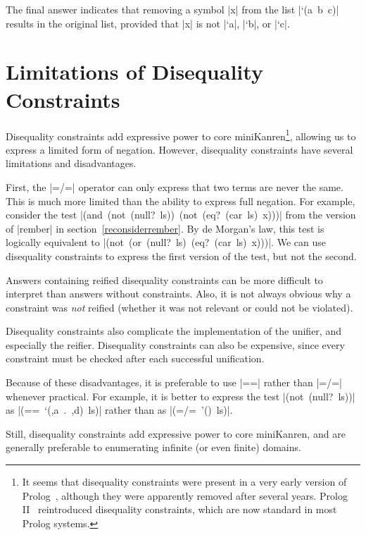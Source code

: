 The final answer indicates that removing a symbol \mbox{\scheme|x|}
from the list \mbox{\scheme|`(a b c)|} results in the original list,
provided that \mbox{\scheme|x|} is not \mbox{\scheme|`a|},
\mbox{\scheme|`b|}, or \mbox{\scheme|`c|}.


\section{Limitations of Disequality Constraints}\label{diseqlimits}

Disequality constraints add expressive power to core
miniKanren\footnote{It seems that disequality constraints were present
  in a very early version of Prolog~\cite{birthofprolog}, although
  they were apparently removed after several years.  Prolog
  II~\cite{prologtenfigs} reintroduced disequality constraints, which
  are now standard in most Prolog systems.}, allowing us to express a
limited form of negation.  However, disequality constraints have
several limitations and disadvantages.

First, the \mbox{\scheme|=/=|} operator can only express that two
terms are never the same.  This is much more limited than the ability
to express full negation.  For example, consider the test
\mbox{\scheme|(and (not (null? ls)) (not (eq? (car ls) x)))|} from the
version of \mbox{\scheme|rember|} in section~\ref{reconsiderrember}.
By de Morgan's law, this test is logically equivalent to
\mbox{\scheme|(not (or (null? ls) (eq? (car ls) x)))|}.  We can use
disequality constraints to express the first version of the test, but
not the second.

Answers containing reified disequality constraints can be more
difficult to interpret than answers without constraints.  Also, it is
not always obvious why a constraint was \emph{not} reified (whether it
was not relevant or could not be violated).

Disequality constraints also complicate the implementation of the
unifier, and especially the reifier.  Disequality constraints can also
be expensive, since every constraint must be checked after each
successful unification.

Because of these disadvantages, it is preferable to use
\mbox{\scheme|==|} rather than \mbox{\scheme|=/=|} whenever practical.
For example, it is better to express the test \mbox{\scheme|(not (null? ls))|} 
as \mbox{\scheme|(== `(,a . ,d) ls)|} rather than as
\mbox{\scheme|(=/= '() ls)|}.

Still, disequality constraints add expressive power to core miniKanren, and are
generally preferable to enumerating infinite (or even finite) domains.






